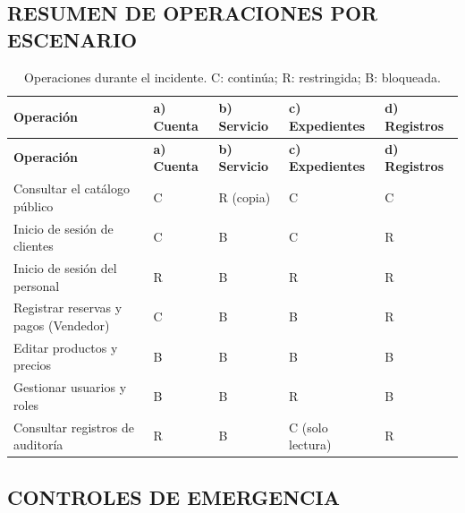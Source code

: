 \documentclass[12pt,letterpaper]{article}
\newenvironment{tabla}{\begin{singlespace}\small\setlength{\tabcolsep}{4pt}\renewcommand{\arraystretch}{1.15}}{\end{singlespace}}
\begin{document}
\subsection{RESUMEN DE OPERACIONES POR ESCENARIO}

\begin{tabla}
\begin{longtable}{L{4.8cm}C{2.0cm}C{2.0cm}C{2.0cm}C{2.0cm}}
\caption{Operaciones durante el incidente. C: continúa; R: restringida; B: bloqueada.}\label{tab:resumen5}\\
\toprule
\textbf{Operación} & \textbf{a) Cuenta} & \textbf{b) Servicio} & \textbf{c) Expedientes} & \textbf{d) Registros}\\
\midrule
\endfirsthead
\toprule
\textbf{Operación} & \textbf{a) Cuenta} & \textbf{b) Servicio} & \textbf{c) Expedientes} & \textbf{d) Registros}\\
\midrule
\endhead
Consultar el catálogo público & C & R (copia) & C & C\\
Inicio de sesión de clientes & C & B & C & R\\
Inicio de sesión del personal & R & B & R & R\\
Registrar reservas y pagos (Vendedor) & C & B & B & R\\
Editar productos y precios & B & B & B & B\\
Gestionar usuarios y roles & B & B & R & B\\
Consultar registros de auditoría & R & B & C (solo lectura) & R\\
\bottomrule
\end{longtable}
\end{tabla}

\subsection{CONTROLES DE EMERGENCIA}
\end{document}
